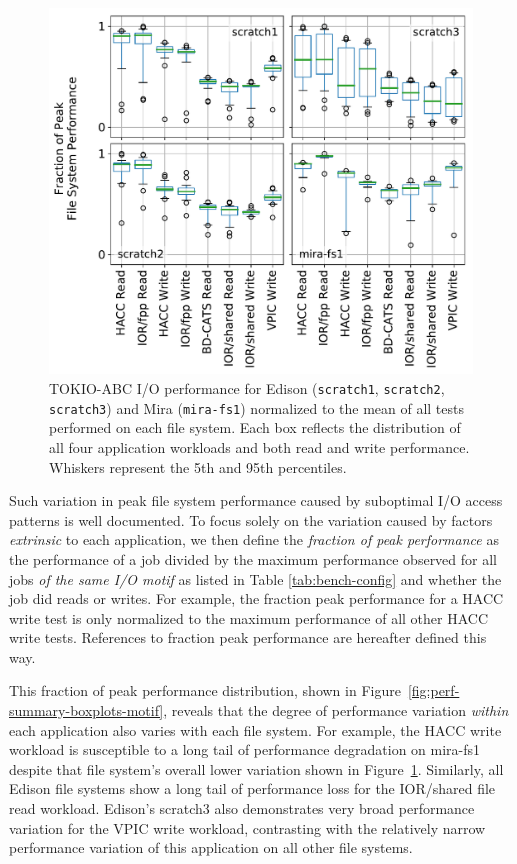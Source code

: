 \begin{figure}[t]
    \centering
    \includegraphics[width=1.0\columnwidth]{figs/perf-boxplots-per-fs.pdf}
    \caption{TOKIO-ABC I/O performance for Edison (\texttt{scratch1},
    \texttt{scratch2}, \texttt{scratch3}) and Mira (\texttt{mira-fs1}) normalized to
    the mean of all tests performed on each file system.  Each box reflects the
    distribution of all four application workloads and both read and write
    performance. Whiskers represent the 5th and 95th percentiles.}
    \label{fig:perf-summary-boxplots-fs}
\end{figure}

Such variation in peak file system performance caused by suboptimal I/O access patterns is well documented\cite{Lofstead2010,Uselton2010,Xie2012}.
To focus solely on the variation caused by factors \emph{extrinsic} to each application, we then define the \emph{fraction of peak performance} as the performance of a job divided by the maximum performance observed for all jobs \emph{of the same I/O motif} as listed in Table \ref{tab:bench-config} and whether the job did reads or writes.
For example, the fraction peak performance for a HACC write test is only normalized to the maximum performance of all other HACC write tests.
References to fraction peak performance are hereafter defined this way.

This fraction of peak performance distribution, shown in Figure~\ref{fig:perf-summary-boxplots-motif}, reveals that the degree of performance variation \emph{within} each application also varies with each file system.
For example, the HACC write workload is susceptible to a long tail of performance degradation on mira-fs1 despite
that file system's overall lower variation shown in Figure~\ref{fig:perf-summary-boxplots-fs}.
Similarly, all Edison file systems show a long tail of performance loss for the IOR/shared file read workload.
Edison's scratch3 also demonstrates very broad performance variation for the VPIC write workload, contrasting with the relatively narrow performance variation of this application on all other file systems.

